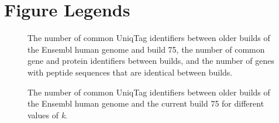 \documentclass[10pt]{article}
\begin{document}
\newpage

\section{Figure Legends}\label{figure-legends}

\begin{figure}[htbp]
\centering
\caption{The number of common UniqTag identifiers between older builds
of the Ensembl human genome and build 75, the number of common gene and
protein identifiers between builds, and the number of genes with peptide
sequences that are identical between builds.}
\end{figure}

\begin{figure}[htbp]
\centering
\caption{The number of common UniqTag identifiers between older builds
of the Ensembl human genome and the current build 75 for different
values of \emph{k}.}
\end{figure}
\end{document}
